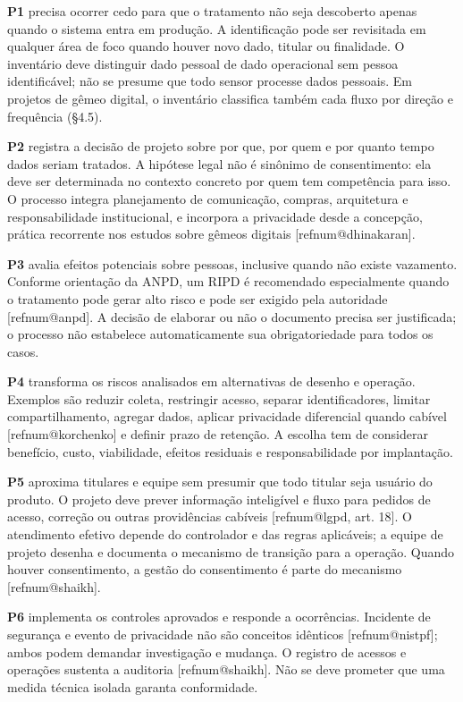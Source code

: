 \documentclass[12pt,a4paper,article,oneside,english,brazil]{abntex2}
\makeatletter
\newcommand{\refnum}[1]{\csname refnum@#1\endcsname}
\makeatother
\begin{document}
\textbf{P1} precisa ocorrer cedo para que o tratamento não seja descoberto apenas quando o sistema entra em produção. A identificação pode ser revisitada em qualquer área de foco quando houver novo dado, titular ou finalidade. O inventário deve distinguir dado pessoal de dado operacional sem pessoa identificável; não se presume que todo sensor processe dados pessoais. Em projetos de gêmeo digital, o inventário classifica também cada fluxo por direção e frequência (§4.5).

\textbf{P2} registra a decisão de projeto sobre por que, por quem e por quanto tempo dados seriam tratados. A hipótese legal não é sinônimo de consentimento: ela deve ser determinada no contexto concreto por quem tem competência para isso. O processo integra planejamento de comunicação, compras, arquitetura e responsabilidade institucional, e incorpora a privacidade desde a concepção, prática recorrente nos estudos sobre gêmeos digitais [\refnum{dhinakaran}].

\textbf{P3} avalia efeitos potenciais sobre pessoas, inclusive quando não existe vazamento. Conforme orientação da ANPD, um RIPD é recomendado especialmente quando o tratamento pode gerar alto risco e pode ser exigido pela autoridade [\refnum{anpd}]. A decisão de elaborar ou não o documento precisa ser justificada; o processo não estabelece automaticamente sua obrigatoriedade para todos os casos.

\textbf{P4} transforma os riscos analisados em alternativas de desenho e operação. Exemplos são reduzir coleta, restringir acesso, separar identificadores, limitar compartilhamento, agregar dados, aplicar privacidade diferencial quando cabível [\refnum{korchenko}] e definir prazo de retenção. A escolha tem de considerar benefício, custo, viabilidade, efeitos residuais e responsabilidade por implantação.

\textbf{P5} aproxima titulares e equipe sem presumir que todo titular seja usuário do produto. O projeto deve prever informação inteligível e fluxo para pedidos de acesso, correção ou outras providências cabíveis [\refnum{lgpd}, art. 18]. O atendimento efetivo depende do controlador e das regras aplicáveis; a equipe de projeto desenha e documenta o mecanismo de transição para a operação. Quando houver consentimento, a gestão do consentimento é parte do mecanismo [\refnum{shaikh}].

\textbf{P6} implementa os controles aprovados e responde a ocorrências. Incidente de segurança e evento de privacidade não são conceitos idênticos [\refnum{nistpf}]; ambos podem demandar investigação e mudança. O registro de acessos e operações sustenta a auditoria [\refnum{shaikh}]. Não se deve prometer que uma medida técnica isolada garanta conformidade.
\end{document}
